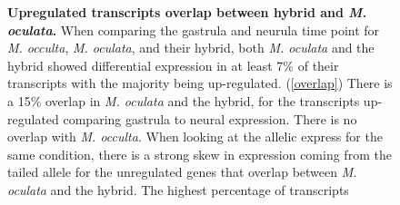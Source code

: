\begin{figure}[!ht]
	\caption{\textbf{Upregulated transcripts overlap between hybrid and \textit{M. oculata}.} When comparing the gastrula and neurula time point for \textit{M. occulta}, \textit{M. oculata}, and their hybrid, both \textit{M. oculata} and the hybrid showed differential expression in at least 7\% of their transcripts with the majority being up-regulated. (\ref{overlap}) There is a 15\% overlap in \textit{M. oculata} and the hybrid, for the transcripts up-regulated comparing gastrula to neural expression. There is no overlap with \textit{M. occulta}. When looking at the allelic express for the same condition, there is a strong skew in expression coming from the tailed allele for the unregulated genes that overlap between \textit{M. oculata} and the hybrid. The highest percentage of transcripts  }	
	\label{fig:upreg_tb}
\end{figure}

